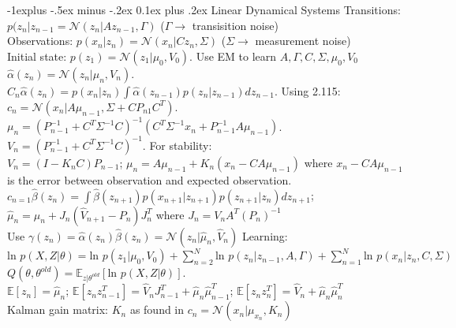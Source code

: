 \documentclass[9pt,landscape]{article}
\makeatletter
\renewcommand{\subsection}{\@startsection{subsection}{2}{0mm}%
                                {-1explus -.5ex minus -.2ex}%
                                {0.1ex plus .2ex}%
                                {\normalfont\scriptsize\bfseries}}
\makeatother
\begin{document}
\begin{multicols}{3}
\subsection{Linear Dynamical Systems}
Transitions: $p(z_n|z_{n-1} = \mathcal{N}(z_n|Az_{n-1}, \Gamma)$ ($\Gamma \rightarrow$ transisition noise)\\
Observations: $p(x_n|z_n) = \mathcal{N}(x_n|Cz_n, \Sigma)$ ($\Sigma \rightarrow$ measurement noise)\\
Initial state: $p(z_1) = \mathcal{N}(z_1|\mu_0, V_0)$. Use EM to learn $A, \Gamma, C, \Sigma, \mu_0, V_0$ \\
$\hat\alpha(z_n) = \mathcal{N}(z_n|\mu_n, V_n)$. \\
$C_n\hat\alpha(z_n) = p(x_n|z_n)\int\hat\alpha(z_{n-1})p(z_n|z_{n-1})dz_{n-1}$. Using 2.115: $c_n = \mathcal{N}(x_n|A\mu_{n-1},\Sigma+CP_{n1}C^T)$. $\mu_n = (P_{n-1}^{-1} + C^T\Sigma^{-1}C)^{-1} (C^T\Sigma^{-1}x_n + P_{n-1}^{-1}A\mu_{n-1})$. $V_n = (P_{n-1}^{-1} + C^T\Sigma^{-1}C)^{-1}$. For stability:\\
$V_n = (I-K_nC)P_{n-1}$; $\mu_n = A\mu_{n-1} + K_n(x_n - CA\mu_{n-1})$ where $x_n-CA\mu_{n-1}$ is the error between observation and expected observation.\\
$c_{n=1}\hat\beta(z_n) = \int \hat\beta(z_{n+1})p(x_{n+1}|z_{n+1}) p(z_{n+1}|z_n) dz_{n+1}$; $\hat\mu_n = \mu_n + J_n(\hat V_{n+1} - P_n)J_n^T$ where $J_n = V_nA^T(P_n)^{-1}$\\
Use $\gamma(z_n) = \hat\alpha(z_n)\hat\beta(z_n) = \mathcal{N}(z_n|\hat\mu_n, \hat V_n)$
Learning: $\text{ln } p(X,Z|\theta) = \text{ln } p(z_1|\mu_0, V_0) + \sum^N_{n=2} \text{ln } p(z_n|z_{n-1}, A, \Gamma) + \sum^N_{n=1} \text{ln } p(x_n|z_n, C, \Sigma)$ \\
$Q(\theta, \theta^{old}) = \mathbb{E}_{z|\theta^{old}}[\text{ln } p(X,Z|\theta)]$.\\
$\mathbb{E}[z_n] = \hat\mu_n$; $\mathbb{E}[z_nz_{n-1}^T] = \hat V_nJ_{n-1}^T+\hat\mu_n\hat\mu_{n-1}^T$; $\mathbb{E}[z_nz_n^T]= \hat V_n + \hat\mu_n\hat\mu_n^T$\\
Kalman gain matrix: $K_n$ as found in $c_n = \mathcal{N}(x_n|\mu_{x_n}, K_n)$


\end{multicols}
\end{document}

